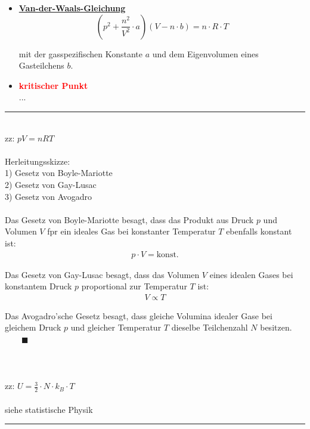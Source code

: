 \documentclass{article}
\newcommand{\lr}[1]{\left(#1\right)}
\begin{document}
	\begin{itemize}
		\item \textbf{\underline{Van-der-Waals-Gleichung}}
			\begin{equation}
				\lr{ p^2 + \frac{n^2}{V^2} \cdot a } (V - n \cdot b) = n \cdot R \cdot T
			\end{equation}
		
		mit der gasspezifischen Konstante $a$ und dem Eigenvolumen eines Gasteilchens $b$.
		
		
		\item \textbf{\textcolor{red}{kritischer Punkt}}\\
		...
	\end{itemize}
	

\newpage


{\color{violet}
\hrule
	\\
	zz: $pV = nRT$\\
	\\
	Herleitungsskizze:\\
	1) Gesetz von Boyle-Mariotte\\
	2) Gesetz von Gay-Lusac\\
	3) Gesetz von Avogadro\\
	\\
	Das Gesetz von Boyle-Mariotte besagt, dass das Produkt aus Druck $p$ und Volumen $V$ fpr ein ideales Gas bei konstanter Temperatur $T$ ebenfalls konstant ist:	 
		\begin{align*}
			p \cdot V = \text{konst.}
		\end{align*}
	
	Das Gesetz von Gay-Lusac besagt, dass das Volumen $V$ eines idealen Gases bei konstantem Druck $p$ proportional zur Temperatur $T$ ist:
		\begin{align*}
			V \propto T
		\end{align*}
	
	Das Avogadro'sche Gesetz besagt, dass gleiche Volumina idealer Gase bei gleichem Druck $p$ und gleicher Temperatur $T$ dieselbe Teilchenzahl $N$ besitzen. $\qquad \blacksquare$\\
	\\
	\\
	\\
	zz: $U = \frac{3}{2} \cdot N \cdot k_B \cdot T$\\
	\\
	siehe statistische Physik
\hrule
}


\newpage
\end{document}
